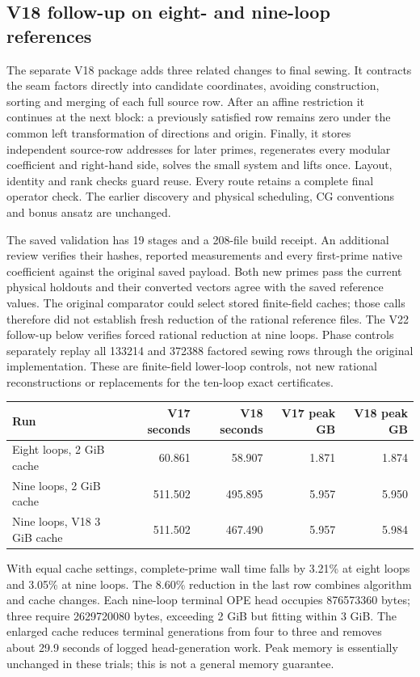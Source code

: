 \documentclass[11pt]{article}
\begin{document}
\subsection{V18 follow-up on eight- and nine-loop references}
The separate V18 package adds three related changes to final sewing. It
contracts the seam factors directly into candidate coordinates, avoiding
construction, sorting and merging of each full source row. After an affine
restriction it continues at the next block: a previously satisfied row
remains zero under the common left transformation of directions and origin.
Finally, it stores independent source-row addresses for later primes,
regenerates every modular coefficient and right-hand side, solves the small
system and lifts once. Layout, identity and rank checks guard reuse. Every
route retains a complete final operator check. The earlier discovery and
physical scheduling, CG conventions and bonus ansatz are unchanged.

The saved validation has 19 stages and a 208-file build receipt. An additional
review verifies their hashes, reported measurements and every first-prime
native coefficient against the original saved payload. Both new primes pass
the current physical holdouts and their converted vectors agree with the saved reference values. The original
comparator could select stored finite-field caches; those calls therefore
did not establish fresh reduction of the rational reference files. The V22
follow-up below verifies forced rational reduction at nine loops. Phase controls separately replay
all 133214 and 372388 factored sewing rows through the original implementation.
These are finite-field lower-loop controls, not new rational reconstructions
or replacements for the ten-loop exact certificates.

\begin{center}
\begin{tabular}{lrrrr}\toprule
Run & V17 seconds & V18 seconds & V17 peak GB & V18 peak GB\\\midrule
Eight loops, 2 GiB cache & 60.861 & 58.907 & 1.871 & 1.874\\
Nine loops, 2 GiB cache & 511.502 & 495.895 & 5.957 & 5.950\\
Nine loops, V18 3 GiB cache & 511.502 & 467.490 & 5.957 & 5.984\\
\bottomrule
\end{tabular}
\end{center}
With equal cache settings, complete-prime wall time falls by 3.21\% at eight
loops and 3.05\% at nine loops. The 8.60\% reduction in the last row combines
algorithm and cache changes. Each nine-loop terminal OPE head occupies
876573360 bytes; three require 2629720080 bytes, exceeding 2 GiB but fitting
within 3 GiB. The enlarged cache reduces terminal generations from four to
three and removes about 29.9 seconds of logged head-generation work. Peak
memory is essentially unchanged in these trials; this is not a general
memory guarantee.
\end{document}
